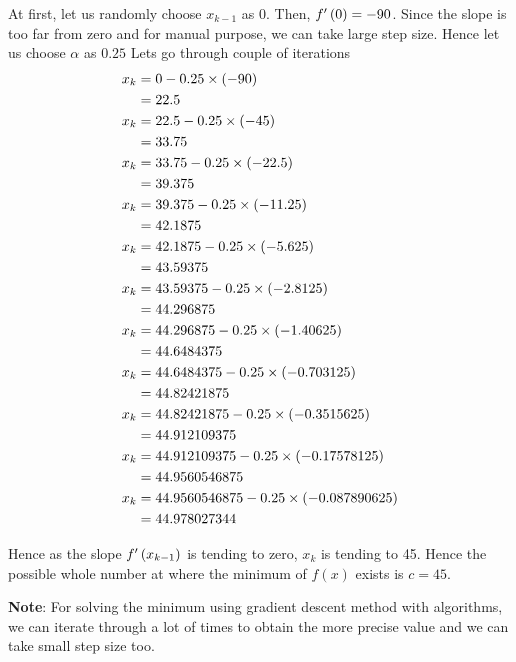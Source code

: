 \documentclass[journal,12pt,twocolumn]{IEEEtran}
\begin{document}
\begin{flushleft}
At first, let us randomly choose $x_{k-1}$ as $0$. Then, $f^{\prime}\left(0\right) = -90 $.\newline
Since the slope is too far from zero and for manual purpose, we can take large step size. Hence let us choose $\alpha$ as $0.25$ \newline
Lets go through couple of iterations
\begin{align}
    x_k &= 0 - 0.25\times\left(-90\right)  \nonumber \\
    &= 22.5 \\
    x_k &= 22.5 - 0.25\times\left(-45\right) \nonumber \\
    &= 33.75 \\
    x_k &= 33.75 - 0.25\times\left(-22.5\right) \nonumber \\
    &= 39.375 \\
    x_k &= 39.375 - 0.25\times\left(-11.25\right) \nonumber \\
    &= 42.1875 \\
    x_k &= 42.1875 - 0.25\times\left(-5.625\right) \nonumber \\
    &= 43.59375 \\
    x_k &= 43.59375 - 0.25\times\left(-2.8125\right) \nonumber \\
    &= 44.296875 \\
    x_k &= 44.296875 - 0.25\times\left(-1.40625\right) \nonumber \\
    &= 44.6484375 \\
    x_k &= 44.6484375 - 0.25\times\left(-0.703125\right) \nonumber \\
    &= 44.82421875 \\
    x_k &= 44.82421875 - 0.25\times\left(-0.3515625\right) \nonumber \\
    &= 44.912109375 \\
    x_k &= 44.912109375 - 0.25\times\left(-0.17578125\right) \nonumber \\
    &= 44.9560546875 \\
    x_k &= 44.9560546875 - 0.25\times\left(-0.087890625\right) \nonumber \\
    &= 44.978027344
\end{align}

Hence as the slope $f^{\prime}\left(x_{k-1}\right)$ is tending to zero, $x_k$ is tending to 45. Hence the possible whole number at where the minimum of $f(x)$ exists is $c=45$.


\textbf{Note}: For solving the minimum using gradient descent method with algorithms, we can iterate through a lot of times to obtain the more precise value and we can take small step size too.\newline


\end{flushleft}
\end{document}
